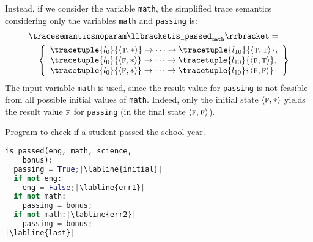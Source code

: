 \begin{example}
Instead, if we consider the variable \texttt{math}, the simplified trace semantics considering only the variables \texttt{math} and \texttt{passing} is:
\begin{align*}
  &{\tracesemanticsnoparam\semanticsof{\texttt{is\_passed}_\texttt{math}}
  =}\\
  &\quad\left\{
    \begin{array}{l}
    \tracetuple{\locinit}{\tuple\true\anyvalue}\tracearrow\tracetuple{\loc{10}}{\tuple\true\true}, \\
    \tracetuple{\locinit}{\tuple\false\anyvalue}\tracearrow\tracetuple{\loc{10}}{\tuple\false\true}, \\
    \tracetuple{\locinit}{\tuple\false\anyvalue}\tracearrow\tracetuple{\loc{10}}{\tuple\false\false}
  \end{array}
  \right\}
\end{align*}
The input variable \texttt{math} is used, since the result value for \texttt{passing} is not feasible from all possible initial values of \texttt{math}.
Indeed, only the initial state $\langle \textsc{f}, {*} \rangle$ yields the result value $\textsc{f}$ for \texttt{passing} (in the final state $\langle \textsc{f}, \textsc{f} \rangle$).
\end{example}
\begin{marginlisting}[*-35]
  \caption{Program to check if a student passed the school year.}
  \vspace{2\lineheight}
\begin{lstlisting}[language=Python,escapechar=|]
is_passed(eng, math, science,
    bonus):
  passing = True;|\labline{initial}|
  if not eng:
    eng = False;|\labline{err1}|
  if not math:
    passing = bonus;
  if not math:|\labline{err2}|
    passing = bonus;
|\labline{last}|
\end{lstlisting}
\end{marginlisting}

